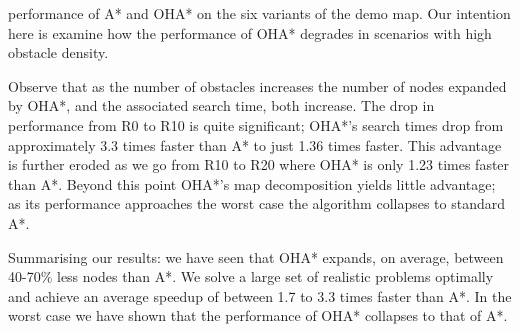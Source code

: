 performance of A* and OHA* on the six variants of the demo map.
Our intention here is examine how the performance of OHA* degrades in scenarios with
high obstacle density.

Observe that as the number of obstacles increases the number of nodes expanded by OHA*, and the
associated search time, both increase. 
The drop in performance from R0 to R10 is quite significant; OHA*'s search times drop
from approximately 3.3 times faster than A* to just 1.36 times faster.
This advantage is further eroded as we go from R10 to R20 where OHA* is only 
1.23 times faster than A*.
Beyond this point OHA*'s map decomposition yields little advantage; 
as its performance approaches the worst case the algorithm collapses
to standard A*.
\par
Summarising our results: we have seen that OHA* expands, on average, between 40-70\% less nodes than A*.
We solve a large set of realistic problems optimally and achieve an average speedup of between 1.7 to 
3.3 times faster than A*.
In the worst case we have shown that the performance of OHA* collapses to that of A*.
